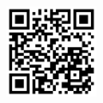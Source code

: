 \documentclass[11pt]{book}
\newcommand{\sol}{\bigskip \bigskip \bigskip \bigskip \bigskip \bigskip }
\begin{document}
\sol 

\begin{figure}[bp]
\begin{center}
	\includegraphics[width=3cm]{../Image/QrCode/github-page}
\end{center}

\bigskip

\hfill 
\end{figure}

\newpage

\clearpage
{}
	
\end{document}
